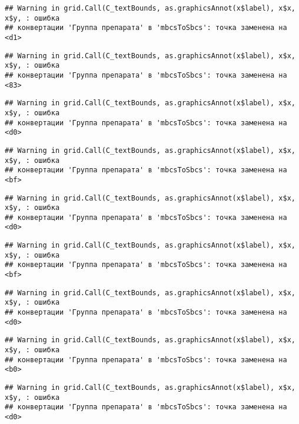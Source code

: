 \documentclass[
]{article}
\begin{document}
\begin{verbatim}
## Warning in grid.Call(C_textBounds, as.graphicsAnnot(x$label), x$x, x$y, : ошибка
## конвертации 'Группа препарата' в 'mbcsToSbcs': точка заменена на <d1>
\end{verbatim}

\begin{verbatim}
## Warning in grid.Call(C_textBounds, as.graphicsAnnot(x$label), x$x, x$y, : ошибка
## конвертации 'Группа препарата' в 'mbcsToSbcs': точка заменена на <83>
\end{verbatim}

\begin{verbatim}
## Warning in grid.Call(C_textBounds, as.graphicsAnnot(x$label), x$x, x$y, : ошибка
## конвертации 'Группа препарата' в 'mbcsToSbcs': точка заменена на <d0>
\end{verbatim}

\begin{verbatim}
## Warning in grid.Call(C_textBounds, as.graphicsAnnot(x$label), x$x, x$y, : ошибка
## конвертации 'Группа препарата' в 'mbcsToSbcs': точка заменена на <bf>
\end{verbatim}

\begin{verbatim}
## Warning in grid.Call(C_textBounds, as.graphicsAnnot(x$label), x$x, x$y, : ошибка
## конвертации 'Группа препарата' в 'mbcsToSbcs': точка заменена на <d0>
\end{verbatim}

\begin{verbatim}
## Warning in grid.Call(C_textBounds, as.graphicsAnnot(x$label), x$x, x$y, : ошибка
## конвертации 'Группа препарата' в 'mbcsToSbcs': точка заменена на <bf>
\end{verbatim}

\begin{verbatim}
## Warning in grid.Call(C_textBounds, as.graphicsAnnot(x$label), x$x, x$y, : ошибка
## конвертации 'Группа препарата' в 'mbcsToSbcs': точка заменена на <d0>
\end{verbatim}

\begin{verbatim}
## Warning in grid.Call(C_textBounds, as.graphicsAnnot(x$label), x$x, x$y, : ошибка
## конвертации 'Группа препарата' в 'mbcsToSbcs': точка заменена на <b0>
\end{verbatim}

\begin{verbatim}
## Warning in grid.Call(C_textBounds, as.graphicsAnnot(x$label), x$x, x$y, : ошибка
## конвертации 'Группа препарата' в 'mbcsToSbcs': точка заменена на <d0>
\end{verbatim}
\end{document}
